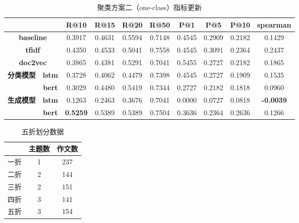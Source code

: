 \documentclass[11pt]{article}
\begin{document}
\begin{CJK}{UTF8}{gkai}
\begin{table}[htbp]
  \centering
  \begin{tabular}{c|c|c|c|c|c|c|c|c|c}
    \hline
    \multicolumn{2}{c}{} & \textbf{R@10} & \textbf{R@15} & \textbf{R@20} & \textbf{R@50} & \textbf{P@1} & \textbf{P@5} & \textbf{P@10} & \textbf{spearman} \\
    \hline
    \multicolumn{2}{c}{\textbf{baseline}} & 0.3917  & 0.4631  & 0.5594  & 0.7148  & 0.4545  & 0.2909  & 0.2182  & 0.1429  \\
    \hline
    \multicolumn{2}{c}{\textbf{tfidf}} & 0.4350  & 0.4533  & 0.5041  & 0.7558  & 0.4545  & 0.3091  & 0.2364  & 0.2437  \\
    \hline
    \multicolumn{2}{c}{\textbf{doc2vec}} & 0.3865  & 0.4381  & 0.5291  & 0.7041  & 0.5455  & 0.2727  & 0.2182  & 0.1865  \\
    \hline
    \multirow{2}[0]{*}{\textbf{分类模型}} & \textbf{lstm} & 0.3728  & 0.4062  & 0.4479  & 0.7398  & 0.4545  & 0.2727  & 0.1909  & 0.1535  \\
    & \textbf{bert} & 0.3029  & 0.4480  & 0.5419  & 0.7344  & 0.2727  & 0.2182  & 0.1818  & 0.0960  \\
    \hline
    \multirow{2}[0]{*}{\textbf{生成模型}} & \textbf{lstm} & 0.1263  & 0.2463  & 0.3676  & 0.7041  & 0.0000  & 0.0727  & 0.0818  & \textcolor[rgb]{ 0,  .69,  .314}{\textbf{-0.0039 }} \\
    & \textbf{bert} & \textcolor[rgb]{ 1,  0,  0}{\textbf{0.5259 }} & 0.5389  & 0.5389  & 0.7504  & 0.3636  & 0.2364  & 0.2636  & 0.1266  \\
    \hline
  \end{tabular}%
  \caption{聚类方案二（one-class）指标更新}
  \label{tab:addlabel}%
\end{table}%



\begin{table}[htbp]
  \centering
  \begin{tabular}{c|c|c}
    \hline
    & 主题数   & 作文数 \\
    \hline
    一折    & 1     & 237 \\
    \hline
    二折    & 2     & 144 \\
    \hline
    三折    & 2     & 151 \\
    \hline
    四折    & 3     & 141 \\
    \hline
    五折    & 3     & 154 \\
    \hline
  \end{tabular}%
  \caption{五折划分数据}
  \label{tab:addlabel}%
\end{table}%



\end{CJK}
\end{document}
